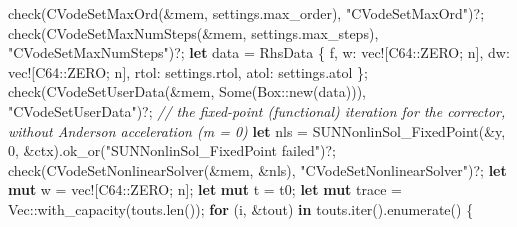 \documentclass[
  10pt,
]{article}
\newenvironment{Shaded}{}{}
\newcommand{\CommentTok}[1]{\textcolor[rgb]{0.38,0.63,0.69}{\textit{#1}}}
\newcommand{\ConstantTok}[1]{\textcolor[rgb]{0.53,0.00,0.00}{#1}}
\newcommand{\ControlFlowTok}[1]{\textcolor[rgb]{0.00,0.44,0.13}{\textbf{#1}}}
\newcommand{\DataTypeTok}[1]{\textcolor[rgb]{0.56,0.13,0.00}{#1}}
\newcommand{\DecValTok}[1]{\textcolor[rgb]{0.25,0.63,0.44}{#1}}
\newcommand{\KeywordTok}[1]{\textcolor[rgb]{0.00,0.44,0.13}{\textbf{#1}}}
\newcommand{\NormalTok}[1]{#1}
\newcommand{\OperatorTok}[1]{\textcolor[rgb]{0.40,0.40,0.40}{#1}}
\newcommand{\PreprocessorTok}[1]{\textcolor[rgb]{0.74,0.48,0.00}{#1}}
\newcommand{\StringTok}[1]{\textcolor[rgb]{0.25,0.44,0.63}{#1}}
\begin{document}
\begin{Shaded}
\begin{Highlighting}[]
\NormalTok{    check(CVodeSetMaxOrd(}\OperatorTok{\&}\NormalTok{mem}\OperatorTok{,}\NormalTok{ settings}\OperatorTok{.}\NormalTok{max\_order)}\OperatorTok{,} \StringTok{"CVodeSetMaxOrd"}\NormalTok{)}\OperatorTok{?;}
\NormalTok{    check(CVodeSetMaxNumSteps(}\OperatorTok{\&}\NormalTok{mem}\OperatorTok{,}\NormalTok{ settings}\OperatorTok{.}\NormalTok{max\_steps)}\OperatorTok{,} \StringTok{"CVodeSetMaxNumSteps"}\NormalTok{)}\OperatorTok{?;}
    \KeywordTok{let}\NormalTok{ data }\OperatorTok{=}\NormalTok{ RhsData }\OperatorTok{\{}\NormalTok{ f}\OperatorTok{,}\NormalTok{ w}\OperatorTok{:} \PreprocessorTok{vec!}\NormalTok{[}\PreprocessorTok{C64::}\NormalTok{ZERO}\OperatorTok{;}\NormalTok{ n]}\OperatorTok{,}\NormalTok{ dw}\OperatorTok{:} \PreprocessorTok{vec!}\NormalTok{[}\PreprocessorTok{C64::}\NormalTok{ZERO}\OperatorTok{;}\NormalTok{ n]}\OperatorTok{,}\NormalTok{ rtol}\OperatorTok{:}\NormalTok{ settings}\OperatorTok{.}\NormalTok{rtol}\OperatorTok{,}\NormalTok{ atol}\OperatorTok{:}\NormalTok{ settings}\OperatorTok{.}\NormalTok{atol }\OperatorTok{\};}
\NormalTok{    check(CVodeSetUserData(}\OperatorTok{\&}\NormalTok{mem}\OperatorTok{,} \ConstantTok{Some}\NormalTok{(}\DataTypeTok{Box}\PreprocessorTok{::}\NormalTok{new(data)))}\OperatorTok{,} \StringTok{"CVodeSetUserData"}\NormalTok{)}\OperatorTok{?;}
    \CommentTok{// the fixed{-}point (functional) iteration for the corrector, without Anderson acceleration (m = 0)}
    \KeywordTok{let}\NormalTok{ nls }\OperatorTok{=}\NormalTok{ SUNNonlinSol\_FixedPoint(}\OperatorTok{\&}\NormalTok{y}\OperatorTok{,} \DecValTok{0}\OperatorTok{,} \OperatorTok{\&}\NormalTok{ctx)}\OperatorTok{.}\NormalTok{ok\_or(}\StringTok{"SUNNonlinSol\_FixedPoint failed"}\NormalTok{)}\OperatorTok{?;}
\NormalTok{    check(CVodeSetNonlinearSolver(}\OperatorTok{\&}\NormalTok{mem}\OperatorTok{,} \OperatorTok{\&}\NormalTok{nls)}\OperatorTok{,} \StringTok{"CVodeSetNonlinearSolver"}\NormalTok{)}\OperatorTok{?;}
    \KeywordTok{let} \KeywordTok{mut}\NormalTok{ w }\OperatorTok{=} \PreprocessorTok{vec!}\NormalTok{[}\PreprocessorTok{C64::}\NormalTok{ZERO}\OperatorTok{;}\NormalTok{ n]}\OperatorTok{;}
    \KeywordTok{let} \KeywordTok{mut}\NormalTok{ t }\OperatorTok{=}\NormalTok{ t0}\OperatorTok{;}
    \KeywordTok{let} \KeywordTok{mut}\NormalTok{ trace }\OperatorTok{=} \DataTypeTok{Vec}\PreprocessorTok{::}\NormalTok{with\_capacity(touts}\OperatorTok{.}\NormalTok{len())}\OperatorTok{;}
    \ControlFlowTok{for}\NormalTok{ (i}\OperatorTok{,} \OperatorTok{\&}\NormalTok{tout) }\KeywordTok{in}\NormalTok{ touts}\OperatorTok{.}\NormalTok{iter()}\OperatorTok{.}\NormalTok{enumerate() }\OperatorTok{\{}

\end{Highlighting}
\end{Shaded}
\end{document}
